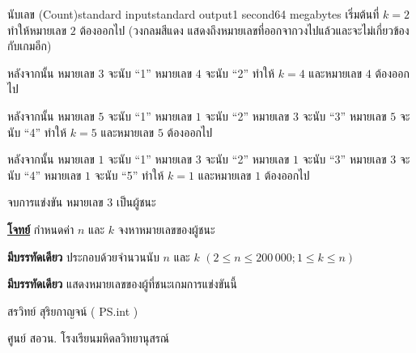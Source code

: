 \documentclass[11pt,a4paper]{article}
\begin{document}
\begin{problem}{นับเลข (Count)}{standard input}{standard output}{1 second}{64 megabytes}
เริ่มต้นที่ $k = 2$ ทำให้หมายเลข $2$ ต้องออกไป (วงกลมสีแดง แสดงถึงหมายเลขที่ออกจากวงไปแล้วและจะไม่เกี่ยวข้องกับเกมอีก)

หลังจากนั้น หมายเลข $3$ จะนับ “1”  หมายเลข $4$ จะนับ “2”  ทำให้ $k = 4$ และหมายเลข $4$ ต้องออกไป

หลังจากนั้น หมายเลข $5$ จะนับ “1”  หมายเลข $1$ จะนับ “2”  หมายเลข $3$ จะนับ “3”  หมายเลข $5$ จะนับ “4”  ทำให้ $k = 5$ และหมายเลข $5$ ต้องออกไป

หลังจากนั้น หมายเลข $1$ จะนับ “1”  หมายเลข $3$ จะนับ “2”  หมายเลข $1$ จะนับ “3”  หมายเลข $3$ จะนับ “4”  หมายเลข $1$ จะนับ “5”  ทำให้ $k = 1$ และหมายเลข $1$ ต้องออกไป

จบการแข่งขัน หมายเลข $3$ เป็นผู้ชนะ

\bigskip
\underline{\textbf{โจทย์}}  กำหนดค่า $n$ และ $k$ จงหาหมายเลขของผู้ชนะ


\InputFile

\textbf{มีบรรทัดเดียว} ประกอบด้วยจำนวนนับ $n$ และ $k$ $( 2 \leq n \leq 200\,000 ; 1 \leq k \leq n )$


\OutputFile

\textbf{มีบรรทัดเดียว} แสดงหมายเลขของผู้ที่ชนะเกมการแข่งขันนี้

\Examples

\begin{example}
%
%
%
\end{example}

  
\Source

สรวิทย์  สุริยกาญจน์ ( PS.int )

ศูนย์ สอวน. โรงเรียนมหิดลวิทยานุสรณ์

\end{problem}
\end{document}
